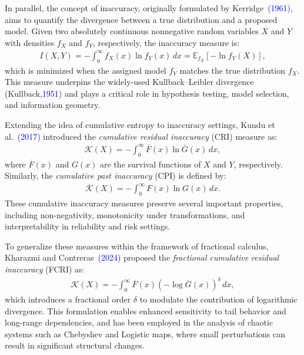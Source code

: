\documentclass[12pt, a4paper]{article}
\numberwithin{equation}{section}
\begin{document}
In parallel, the concept of inaccuracy, originally formulated by Kerridge~\textcolor{blue}{(1961)}, aims to quantify the divergence between a true distribution and a proposed model. Given two absolutely continuous nonnegative random variables $X$ and $Y$ with densities $f_X$ and $f_Y$, respectively, the inaccuracy measure is:
\begin{align}
	I(X, Y) = -\int_0^\infty f_X(x) \ln f_Y(x) \, dx = \mathbb{E}_{f_X}[-\ln f_Y(X)],
\end{align}
which is minimized when the assigned model $f_Y$ matches the true distribution $f_X$. This measure underpins the widely-used Kullback–Leibler divergence (Kullback,\textcolor{blue} {1951}) and plays a critical role in hypothesis testing, model selection, and information geometry.

Extending the idea of cumulative entropy to inaccuracy settings, Kundu et al.~\textcolor{blue}{(2017)} introduced the \textit{cumulative residual inaccuracy} (CRI) measure as:
\begin{align}
	\mathcal{K}(X) = -\int_0^\infty \overline{F}(x) \ln \overline{G}(x) \, dx,
\end{align}
where $\overline{F}(x)$ and $\overline{G}(x)$ are the survival functions of $X$ and $Y$, respectively. Similarly, the \textit{cumulative past inaccuracy} (CPI) is defined by:
\begin{align}
	\overline{\mathcal{K}}(X) = -\int_0^\infty F(x) \ln G(x) \, dx. \tag{1.6}
\end{align}
These cumulative inaccuracy measures preserve several important properties, including non-negativity, monotonicity under transformations, and interpretability in reliability and risk settings.

To generalize these measures within the framework of fractional calculus, Kharazmi and Contreras~\textcolor{blue}{(2024)} proposed the \textit{fractional cumulative residual inaccuracy} (FCRI) as:
\begin{align}
	\mathcal{K}(X) = -\int_0^\infty \overline{F}(x) \left(-\log \overline{G}(x)\right)^\delta \, dx,
\end{align}
which introduces a fractional order $\delta$ to modulate the contribution of logarithmic divergence. This formulation enables enhanced sensitivity to tail behavior and long-range dependencies, and has been employed in the analysis of chaotic systems such as Chebyshev and Logistic maps, where small perturbations can result in significant structural changes.
\end{document}
